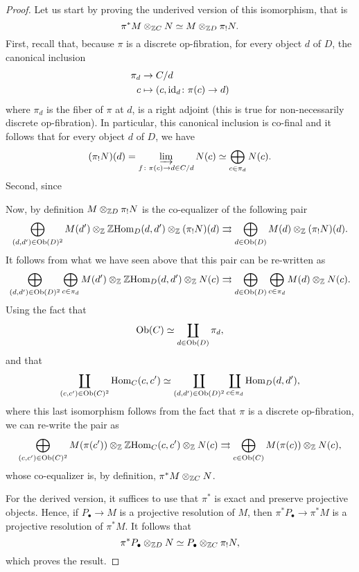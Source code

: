 \documentclass{amsart}
\newcommand{\id}{\mathrm{id}}
\renewcommand{\homset}[3]{\mathrm{Hom}_{#1}(#2,#3)}
\begin{document}
\begin{proof}
  Let us start by proving the underived version of this isomorphism,
  that is
  \[
   \pi^*M\otimes_{\mathbb Z C} N \simeq M\otimes_{\mathbb Z D}\pi_!N.
 \]
 First, recall that, because $\pi$ is a discrete op-fibration, for every
 object $d$ of $D$, the
 canonical inclusion
 \[
   \begin{aligned}
     \pi_d &\to \tr{C}{d}\\
     c &\mapsto (c,\id_{d} \colon \pi(c) \to d)
   \end{aligned}
 \]
 where $\pi_d$ is the fiber of $\pi$ at $d$, is a right adjoint (this
 is true for non-necessarily discrete op-fibration). In particular,
 this canonical inclusion is co-final and it follows that for every
 object $d$ of $D$, we have
 \[
   (\pi_!N)(d) = \varinjlim_{f \colon \pi(c) \to d \in C/d}N(c) \simeq
   \bigoplus_{c \in \pi_d}N(c).
 \]
 Second, since

 Now, by definition $M\otimes_{\mathbb Z D}\pi_!N$ is the co-equalizer of the
 following pair
 \[
   \bigoplus_{(d,d') \in
     \Ob(D)^2}M(d')\tens{\Z}\Z\homset{D}{d}{d'}\tens{\Z}(\pi_!N)(d)
   \rightrightarrows \bigoplus_{d \in \Ob(D)}M(d)\tens{\Z}(\pi_!N)(d).
 \]
 It follows from what we have seen above that this pair can be
 re-written as
 \[
   \bigoplus_{(d,d') \in
     \Ob(D)^2}\bigoplus_{c \in
     \pi_d}M(d')\tens{\Z}\Z\homset{D}{d}{d'}\tens{\Z}N(c)
   \rightrightarrows \bigoplus_{d \in \Ob(D)}\bigoplus_{c \in
     \pi_d}M(d)\tens{\Z}N(c).
 \]
 Using the fact that \[\mathrm{Ob}(C)\simeq\coprod_{d \in \mathrm{Ob}(D)}\pi_d,\] and that
 \[
   \coprod_{(c,c')\in \Ob(C)^2}\homset{C}{c}{c'} \simeq
   \coprod_{(d,d') \in \Ob(D)^2}\coprod_{c\in \pi_d}\homset{D}{d}{d'},
 \]
 where this last isomorphism follows from the fact that $\pi$ is a
 discrete op-fibration, we can re-write the pair as
 \[
   \bigoplus_{(c,c') \in
     \Ob(C)^2}M(\pi(c'))\tens{\Z}\Z\homset{C}{c}{c'}\tens{\Z}N(c)\rightrightarrows
   \bigoplus_{c \in \Ob(C)}M(\pi(c))\tens{\Z}N(c),
 \]
 whose co-equalizer is, by definition, $\pi^*M\otimes_{\mathbb Z C}N$.

 For the derived version, it suffices to use that $\pi^*$ is exact and
 preserve projective objects. Hence, if $P_{\bullet} \to M$ is a projective
 resolution of $M$, then $\pi^*P_{\bullet} \to \pi^*M$ is a projective
 resolution of $\pi^*M$. It follows that
 \[
   \pi^*P_{\bullet}\otimes_{\mathbb Z D}N \simeq P_{\bullet}\otimes_{\mathbb Z C}\pi_!N,
 \]
 which proves the result.
\end{proof}
\end{document}
